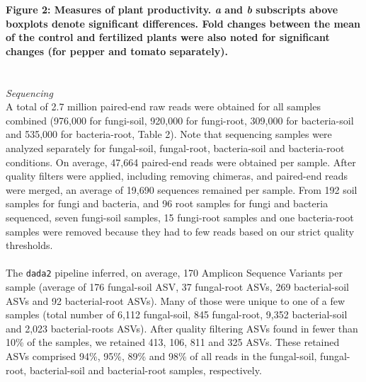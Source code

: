 \documentclass[11pt,]{article}
\begin{document}
\textbf{Figure 2: Measures of plant productivity. \emph{a} and \emph{b}
subscripts above boxplots denote significant differences. Fold changes
between the mean of the control and fertilized plants were also noted
for significant changes (for pepper and tomato separately).}\\
\hspace*{0.333em}\\
\hspace*{0.333em}\\
\emph{Sequencing}\\
A total of 2.7 million paired-end raw reads were obtained for all
samples combined (976,000 for fungi-soil, 920,000 for fungi-root,
309,000 for bacteria-soil and 535,000 for bacteria-root, Table 2). Note
that sequencing samples were analyzed separately for fungal-soil,
fungal-root, bacteria-soil and bacteria-root conditions. On average,
47,664 paired-end reads were obtained per sample. After quality filters
were applied, including removing chimeras, and paired-end reads were
merged, an average of 19,690 sequences remained per sample. From 192
soil samples for fungi and bacteria, and 96 root samples for fungi and
bacteria sequenced, seven fungi-soil samples, 15 fungi-root samples and
one bacteria-root samples were removed because they had to few reads
based on our strict quality thresholds.\\
\hspace*{0.333em}\\
The \texttt{dada2} pipeline inferred, on average, 170 Amplicon Sequence
Variants per sample (average of 176 fungal-soil ASV, 37 fungal-root
ASVs, 269 bacterial-soil ASVs and 92 bacterial-root ASVs). Many of those
were unique to one of a few samples (total number of 6,112 fungal-soil,
845 fungal-root, 9,352 bacterial-soil and 2,023 bacterial-roots ASVs).
After quality filtering ASVs found in fewer than 10\% of the samples, we
retained 413, 106, 811 and 325 ASVs. These retained ASVs comprised 94\%,
95\%, 89\% and 98\% of all reads in the fungal-soil, fungal-root,
bacterial-soil and bacterial-root samples, respectively.\\
\hspace*{0.333em}\\
\hspace*{0.333em}
\end{document}
